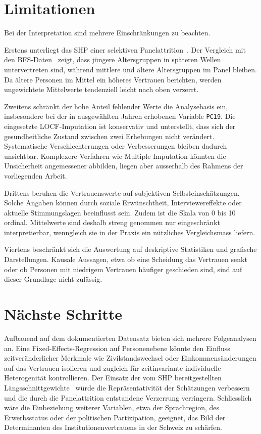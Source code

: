 
\section{Limitationen}
\label{sec:limitationen}

Bei der Interpretation sind mehrere Einschränkungen zu beachten.

Erstens unterliegt das SHP einer selektiven Panelattrition~\cite{Voorpostel2018}. Der Vergleich mit den
BFS-Daten~\cite{BFS2023} zeigt, dass jüngere Altersgruppen in späteren Wellen untervertreten sind,
während mittlere und ältere Altersgruppen im Panel bleiben. Da ältere Personen im
Mittel ein höheres Vertrauen berichten, werden ungewichtete Mittelwerte tendenziell
leicht nach oben verzerrt.

Zweitens schränkt der hohe Anteil fehlender Werte die Analysebasis ein, insbesondere
bei der in ausgewählten Jahren erhobenen Variable \texttt{PC19}. Die eingesetzte
LOCF-Imputation ist konservativ und unterstellt, dass sich der gesundheitliche Zustand
zwischen zwei Erhebungen nicht verändert. Systematische Verschlechterungen oder
Verbesserungen bleiben dadurch unsichtbar. Komplexere Verfahren wie Multiple
Imputation könnten die Unsicherheit angemessener abbilden, liegen aber ausserhalb des
Rahmens der vorliegenden Arbeit.

Drittens beruhen die Vertrauenswerte auf subjektiven Selbsteinschätzungen. Solche
Angaben können durch soziale Erwünschtheit, Interviewereffekte oder aktuelle
Stimmungslagen beeinflusst sein. Zudem ist die Skala von 0 bis 10 ordinal. Mittelwerte
sind deshalb streng genommen nur eingeschränkt interpretierbar, wenngleich sie in der
Praxis ein nützliches Vergleichsmass liefern.

Viertens beschränkt sich die Auswertung auf deskriptive Statistiken und grafische
Darstellungen. Kausale Aussagen, etwa ob eine Scheidung das Vertrauen senkt oder ob
Personen mit niedrigem Vertrauen häufiger geschieden sind, sind auf dieser Grundlage
nicht zulässig.



\section{Nächste Schritte}
\label{sec:naechsteschritte}

Aufbauend auf dem dokumentierten Datensatz bieten sich mehrere Folgeanalysen an. Eine
Fixed-Effects-Regression auf Personenebene könnte den Einfluss zeitveränderlicher
Merkmale wie Zivilstandswechsel oder Einkommensänderungen auf das Vertrauen isolieren
und zugleich für zeitinvariante individuelle Heterogenität kontrollieren. Der Einsatz
der vom SHP bereitgestellten Längsschnittgewichte~\cite{FORS2024} würde die Repräsentativität der
Schätzungen verbessern und die durch die Panelattrition entstandene Verzerrung
verringern. Schliesslich wäre die Einbeziehung weiterer Variablen, etwa der
Sprachregion, des Erwerbsstatus oder der politischen Partizipation, geeignet, das
Bild der Determinanten des Institutionenvertrauens in der Schweiz zu schärfen.

